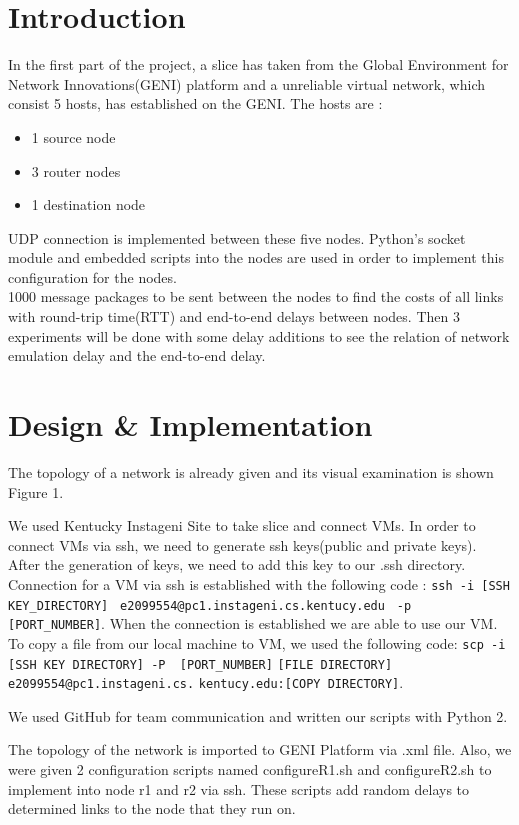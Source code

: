 \documentclass[conference]{IEEEtran}
\begin{document}
\section{Introduction}
In the first part of the project, a slice has taken from the Global Environment for Network Innovations(GENI) platform and a unreliable virtual network, which consist 5 hosts, has established on the GENI. The hosts are :
\begin{itemize}
\item 1 source node
\item 3 router nodes
\item 1 destination node
\end{itemize}

UDP connection is implemented between these five nodes. Python's socket module and embedded scripts into the nodes are used in order to implement this configuration for the nodes. \\

1000 message packages to be sent between the nodes to find the costs of all links with round-trip time(RTT) and end-to-end delays between nodes. Then 3 experiments will be done with some delay additions to see the relation of network emulation delay and the end-to-end delay.

\section{Design \& Implementation}
The topology of a network is already given and its visual examination is shown Figure 1.

We used Kentucky Instageni Site to take slice and connect VMs. In order to connect VMs via ssh, we need to generate ssh keys(public and private keys). After the generation of keys, we need to add this key to our .ssh directory. Connection for a VM via ssh is established with the following code : \verb|ssh -i [SSH KEY_DIRECTORY]| \verb| e2099554@pc1.instageni.cs.kentucy.edu| \verb| -p [PORT_NUMBER]|. When the connection is established we are able to use our VM. To copy a file from our local machine to VM, we used the following code: \verb|scp -i [SSH KEY DIRECTORY] -P  [PORT_NUMBER]| \verb|[FILE DIRECTORY] e2099554@pc1.instageni.cs.| \verb|kentucy.edu:[COPY DIRECTORY]|.

We used GitHub for team communication and written our scripts with Python 2.

The topology of the network is imported to GENI Platform via .xml file. Also, we were given 2 configuration scripts named configureR1.sh and configureR2.sh to implement into node r1 and r2 via ssh. These scripts add random delays to determined links to the node that they run on.\\
\end{document}
